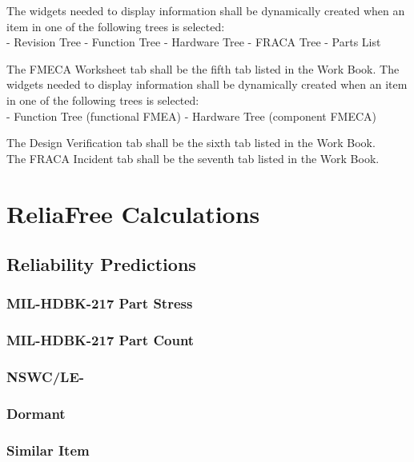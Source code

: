 \documentclass[11pt, 12pt, twoside, onecolumn]{article}
\begin{document}
The widgets needed to display information shall be dynamically created when an item in one of the following trees is selected: \\

    - Revision Tree
    - Function Tree
    - Hardware Tree
    - FRACA Tree
    - Parts List

\noindent The FMECA Worksheet tab shall be the fifth tab listed in the Work Book.  The widgets needed to display information shall be dynamically created when an item in one of the following trees is selected: \\

    - Function Tree (functional FMEA)
    - Hardware Tree (component FMECA)

\noindent The Design Verification tab shall be the sixth tab listed in the Work Book. \\

\noindent The FRACA Incident tab shall be the seventh tab listed in the Work Book. \\

\section{\bf \Large ReliaFree Calculations}

\subsection{\bf \large Reliability Predictions}

\subsubsection{\bf MIL-HDBK-217 Part Stress}
\subsubsection{\bf MIL-HDBK-217 Part Count}
\subsubsection{\bf NSWC/LE-}
\subsubsection{\bf Dormant}
\subsubsection{\bf Similar Item}
\end{document}
